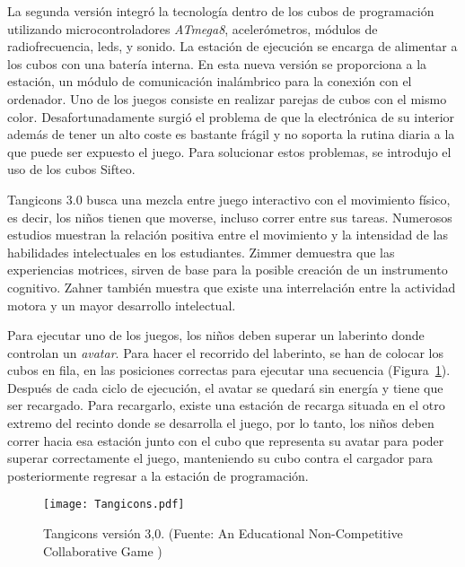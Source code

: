 La segunda versión integró la tecnología dentro de los cubos de programación utilizando microcontroladores \emph{ATmega8}, acelerómetros, módulos de radiofrecuencia, leds, y sonido. La estación de ejecución se encarga de alimentar a los cubos con una batería interna. En esta nueva versión se proporciona a la estación, un módulo de comunicación inalámbrico para la conexión con el ordenador. Uno de los juegos consiste en realizar parejas de cubos con el mismo color. Desafortunadamente surgió el problema de que la electrónica de su interior además de tener un alto coste es bastante frágil y no soporta la rutina diaria a la que puede ser expuesto el juego. Para solucionar estos problemas, se introdujo el uso de los cubos Sifteo.

Tangicons 3.0 busca una mezcla entre juego interactivo con el movimiento físico, es decir, los niños tienen que moverse, incluso correr entre sus tareas. Numerosos estudios muestran la relación positiva entre el movimiento y la intensidad de las habilidades intelectuales en los estudiantes. Zimmer \cite{Zimmer} demuestra que las experiencias motrices, sirven de base para la posible creación de un instrumento cognitivo. Zahner \cite{Zahner} también muestra que existe una interrelación entre la actividad motora y un mayor desarrollo intelectual.

Para ejecutar uno de los juegos, los niños deben superar un laberinto donde controlan un \emph{avatar}. Para hacer el recorrido del laberinto, se han de colocar los cubos en fila, en las posiciones correctas para ejecutar una secuencia (Figura~\ref{fig:Tangicons}). Después de cada ciclo de ejecución, el avatar se quedará sin energía y tiene que ser recargado. Para recargarlo, existe una estación de recarga situada en el otro extremo del recinto donde se desarrolla el juego, por lo tanto, los niños deben correr hacia esa estación junto con el cubo que representa su avatar para poder superar correctamente el juego, manteniendo su cubo contra el cargador para posteriormente regresar a la estación de programación.

\begin{figure}[!h]
\begin{center}
\texttt{[image: Tangicons.pdf]}
\caption{Tangicons versión 3,0. (Fuente: An Educational Non-Competitive Collaborative Game \cite{Tangicons})}
\label{fig:Tangicons}
\end{center}
\end{figure}



